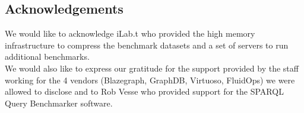 \documentclass[twocolumn]{bmcart}%
\begin{document}
\begin{backmatter}
\section*{Acknowledgements}
We would like to acknowledge iLab.t who provided the high memory infrastructure to compress the benchmark datasets and a set of servers to run additional benchmarks.\\
We would also like to express our gratitude for the support provided by the staff working for the 4 vendors (Blazegraph, GraphDB, Virtuoso, FluidOps) we were allowed to disclose and to Rob Vesse who provided support for the SPARQL Query Benchmarker software.







\end{backmatter}
\end{document}
